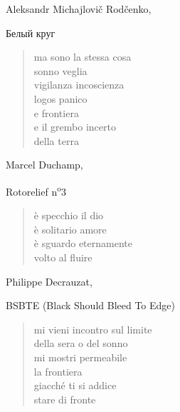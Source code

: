 \begin{volumetitlepage}
\end{volumetitlepage}


\begin{artItem}
	Aleksandr Michajlovič Rodčenko, \begin{otherlanguage}{russian}%
		Белый круг%
	\end{otherlanguage}
\end{artItem}

	\begin{verse}
		ma sono la stessa cosa\\
		sonno veglia\\
		vigilanza incoscienza\\
		logos panico\\
		e frontiera\\
		e il grembo incerto\\
		della terra
	\end{verse}

\clearpage


\begin{artItem}
	Marcel Duchamp, \begin{otherlanguage}{french}%
		Rotorelief n\textsuperscript{o}3%
	\end{otherlanguage}
\end{artItem}

	\begin{verse}
		è specchio il dio\\
		è solitario amore\\
		è sguardo eternamente\\
		volto al fluire
	\end{verse}

\clearpage


\begin{artItem}
	Philippe Decrauzat, \begin{otherlanguage}{english}%
		BSBTE (Black Should Bleed To Edge)%
	\end{otherlanguage}
\end{artItem}

	\begin{verse}
		mi vieni incontro sul limite\\
		della sera o del sonno\\
		mi mostri permeabile\\
		la frontiera\\
		giacché ti si addice\\
		stare di fronte
	\end{verse}

